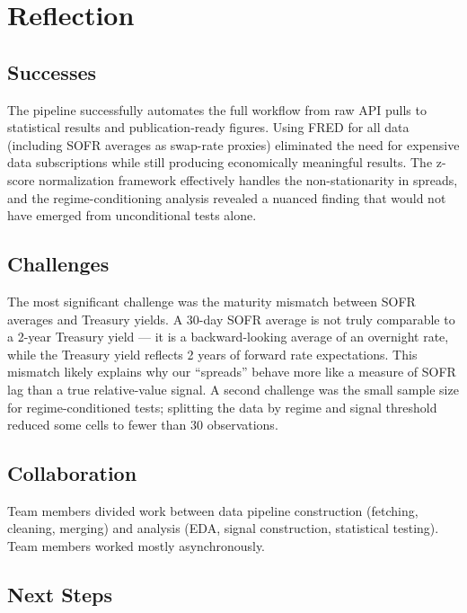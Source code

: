 \documentclass[
  11pt,
  letterpaper,
  DIV=11,
  numbers=noendperiod]{scrartcl}
\begin{document}
\section{Reflection}\label{reflection}

\subsection{Successes}\label{successes}

The pipeline successfully automates the full workflow from raw API pulls
to statistical results and publication-ready figures. Using FRED for all
data (including SOFR averages as swap-rate proxies) eliminated the need
for expensive data subscriptions while still producing economically
meaningful results. The z-score normalization framework effectively
handles the non-stationarity in spreads, and the regime-conditioning
analysis revealed a nuanced finding that would not have emerged from
unconditional tests alone.

\subsection{Challenges}\label{challenges}

The most significant challenge was the maturity mismatch between SOFR
averages and Treasury yields. A 30-day SOFR average is not truly
comparable to a 2-year Treasury yield --- it is a backward-looking
average of an overnight rate, while the Treasury yield reflects 2 years
of forward rate expectations. This mismatch likely explains why our
``spreads'' behave more like a measure of SOFR lag than a true
relative-value signal. A second challenge was the small sample size for
regime-conditioned tests; splitting the data by regime and signal
threshold reduced some cells to fewer than 30 observations.

\subsection{Collaboration}\label{collaboration}

Team members divided work between data pipeline construction (fetching,
cleaning, merging) and analysis (EDA, signal construction, statistical
testing). Team members worked mostly asynchronously.

\subsection{Next Steps}\label{next-steps}
\end{document}
